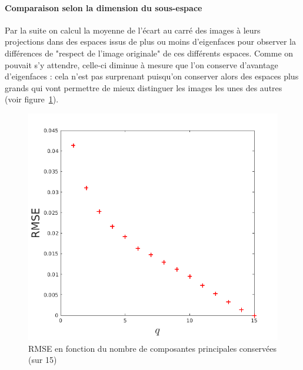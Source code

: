 \documentclass{article}
\begin{document}
\paragraph{Comparaison selon la dimension du sous-espace}
Par la suite on calcul la moyenne de l'écart au carré des images à leurs projections dans des espaces issus de plus ou moins d'eigenfaces pour observer la différences de "respect de l'image originale" de ces différents espaces. Comme on pouvait s'y attendre, celle-ci diminue à mesure que l'on conserve d'avantage d'eigenfaces : cela n'est pas surprenant puisqu'on conserver alors des espaces plus grands qui vont permettre de mieux distinguer les images les unes des autres (voir figure~\ref{rmse}).
\begin{figure}[ht]
    \begin{center}
        \includegraphics[width=0.6\linewidth]{images/2/2_2_rmse.png}
        \caption{RMSE en fonction du nombre de composantes principales conservées (sur 15)}
        \label{rmse}
    \end{center}
\end{figure}
\end{document}
